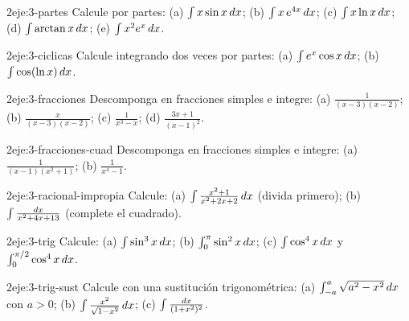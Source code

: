 \begin{ejercicio}{2}{eje:3-partes}
Calcule por partes: (a) $\int x\sin x\mathop{}\!d x$; (b) $\int x\,e^{4x}\mathop{}\!d x$; (c) $\int x\ln x\mathop{}\!d x$; (d) $\int\arctan x\mathop{}\!d x$; (e) $\int x^{2}e^{x}\mathop{}\!d x$.
\end{ejercicio}

\begin{ejercicio}{2}{eje:3-ciclicas}
Calcule integrando dos veces por partes: (a) $\int e^{x}\cos x\mathop{}\!d x$; (b) $\int\cos(\ln x)\mathop{}\!d x$.
\end{ejercicio}

\begin{ejercicio}{2}{eje:3-fracciones}
Descomponga en fracciones simples e integre: (a) $\frac{1}{(x-3)(x-2)}$; (b) $\frac{x}{(x-3)(x-2)}$; (c) $\frac{1}{x^{3}-x}$; (d) $\frac{3x+1}{(x-1)^{2}}$.
\end{ejercicio}

\begin{ejercicio}{2}{eje:3-fracciones-cuad}
Descomponga en fracciones simples e integre: (a) $\frac{1}{(x-1)(x^{2}+1)}$; (b) $\frac{1}{x^{4}-1}$.
\end{ejercicio}

\begin{ejercicio}{2}{eje:3-racional-impropia}
Calcule: (a) $\int\frac{x^{2}+1}{x^{2}+2x+2}\mathop{}\!d x$ (divida primero); (b) $\int\frac{\mathop{}\!d x}{x^{2}+4x+13}$ (complete el cuadrado).
\end{ejercicio}

\begin{ejercicio}{2}{eje:3-trig}
Calcule: (a) $\int\sin^{3}x\mathop{}\!d x$; (b) $\int_0^{\pi}\sin^{2}x\mathop{}\!d x$; (c) $\int\cos^{4}x\mathop{}\!d x$ y $\int_0^{\pi/2}\cos^{4}x\mathop{}\!d x$.
\end{ejercicio}

\begin{ejercicio}{2}{eje:3-trig-sust}
Calcule con una sustitución trigonométrica: (a) $\int_{-a}^{a}\sqrt{a^{2}-x^{2}}\mathop{}\!d x$ con $a>0$; (b) $\int\frac{x^{2}}{\sqrt{1-x^{2}}}\mathop{}\!d x$; (c) $\int\frac{\mathop{}\!d x}{(1+x^{2})^{2}}$.
\end{ejercicio}

